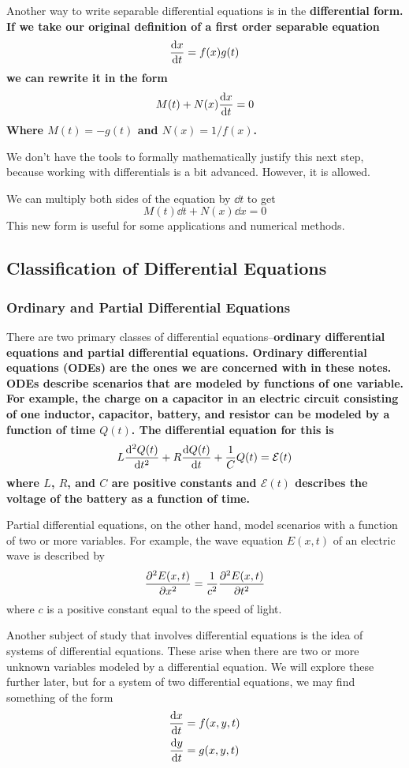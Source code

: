Another way to write separable differential equations is in the \bf{differential form}. If we take our original definition of a first order separable equation
\[ \dv{x}{t} = f(x)g(t)\]
we can rewrite it in the form
\[ M(t) + N(x)\dv{x}{t} = 0\]
Where $M(t) = -g(t)$ and $N(x) = 1/f(x)$. \par
We don't have the tools to formally mathematically justify this next step, because working with differentials is a bit advanced. However, it is allowed. \par 
We can multiply both sides of the equation by $\dd t$ to get
\[ M(t)\dd t + N(x)\dd x = 0 \] 
This new form is useful for some applications and numerical methods.
\subsection{Classification of Differential Equations}
\subsubsection{Ordinary and Partial Differential Equations}
There are two primary classes of differential equations--\bf{ordinary differential equations} and \bf{partial differential equations}. Ordinary differential equations (ODEs) are the ones we are concerned with in these notes. ODEs describe scenarios that are modeled by functions of one variable. For example, the charge on a capacitor in an electric circuit consisting of one inductor, capacitor, battery, and resistor can be modeled by a function of time $Q(t)$. The differential equation for this is
\[ L\dv[2]{Q(t)}{t} + R\dv{Q(t)}{t} + \frac{1}{C}Q(t) = \mathcal{E}(t) \]
where $L$, $R$, and $C$ are positive constants and $\mathcal{E}(t)$ describes the voltage of the battery as a function of time. \par
Partial differential equations, on the other hand, model scenarios with a function of two or more variables. For example, the wave equation $E(x,t)$ of an electric wave is described by
\[ \pdv[2]{E(x,t)}{x} = \frac{1}{c^2}\pdv[2]{E(x,t)}{t}\]
where $c$ is a positive constant equal to the speed of light. \par
Another subject of study that involves differential equations is the idea of systems of differential equations. These arise when there are two or more unknown variables modeled by a differential equation. We will explore these further later, but for a system of two differential equations, we may find something of the form
\begin{align*}
    \dv{x}{t} &= f(x,y,t) \\
    \dv{y}{t} &= g(x,y,t)
\end{align*}
